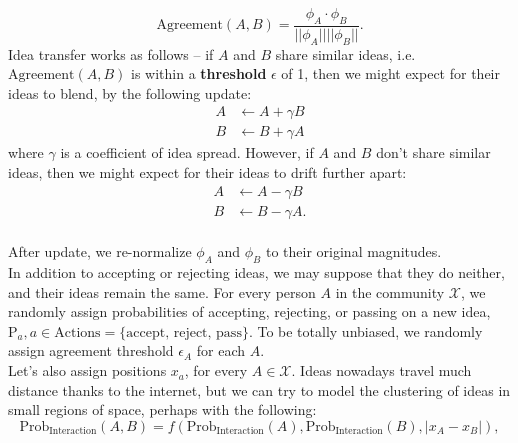 \documentclass{article}
\begin{document}
\begin{flushleft}
\begin{equation}
\textrm{Agreement}(A,B) = \frac{\phi_A \cdot \phi_B}{||\phi_A || || \phi_B ||}.
\end{equation}
Idea transfer works as follows -- if $A$ and $B$ share similar ideas, i.e. $\textrm{Agreement}(A, B)$ is within a \textbf{threshold} $\epsilon$ of 1, then we might expect for their ideas to blend, by the following update:
\begin{align*}
A &\leftarrow A + \gamma B\\
B &\leftarrow B + \gamma A
\end{align*}
where $\gamma$ is a coefficient of idea spread. However, if $A$ and $B$ don't share similar ideas, then we might expect for their ideas to drift further apart:
\begin{align*}
A &\leftarrow A - \gamma B\\
B &\leftarrow B - \gamma A.
\end{align*}\\
\vspace{5pt}
After update, we re-normalize $\phi_A$ and $\phi_B$ to their original magnitudes.\\
\vspace{5pt}
In addition to accepting or rejecting ideas, we may suppose that they do neither, and their ideas remain the same. For every person $A$ in the community $\mathcal{X}$, we randomly assign probabilities of accepting, rejecting, or passing on a new idea, $\textrm{P}_a, a \in \textrm{Actions} = \{\textrm{accept, reject, pass} \}$. To be totally unbiased, we randomly assign agreement threshold $\epsilon_A$ for each $A$. \\
\vspace{5pt}
Let's also assign positions $x_a$, for every $A \in \mathcal{X}$. Ideas nowadays travel much distance thanks to the internet, but we can try to model the clustering of ideas in small regions of space, perhaps with the following:\\
$$ \textrm{Prob}_{\textrm{Interaction}}(A,B) = f(\textrm{Prob}_{\textrm{Interaction}}(A), \textrm{Prob}_{\textrm{Interaction}}(B), |x_A - x_B|), $$


\end{flushleft}
\end{document}
